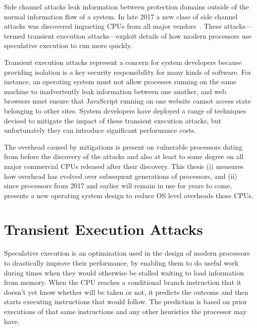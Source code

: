 \noindent
Side channel attacks leak information between protection domains outside of the normal information flow of a system.
In late 2017 a new class of side channel attacks was discovered impacting CPUs from all major vendors~\cite{lipp:meltdown, kocher:spectre}.
These attacks---termed transient execution attacks---exploit details of how modern processors use speculative execution to run more quickly. 

Transient execution attacks represent a concern for system developers because providing isolation is a key security responsibility for many kinds of software.
For instance, an operating system must not allow processes running on the same machine to inadvertently leak information between one another, and web browsers must ensure that JavaScript running on one website cannot access state belonging to other sites.
System developers have deployed a range of techniques devised to mitigate the impact of these transient execution attacks, but unfortunately they can introduce significant performance costs.

The overhead caused by mitigations is present on vulnerable processors dating from before the discovery of the attacks and also at least to some degree on all major commercial CPUs released after their discovery.
This thesis (i) measures how overhead has evolved over subsequent generations of processors, and (ii) since processors from 2017 and earlier will remain in use for years to come, presents a new operating system design to reduce OS level overheads those CPUs.



\section{Transient Execution Attacks}
Speculative execution is an optimization used in the design of modern processors to drastically improve their performance, by enabling them to do useful work during times when they would otherwise be stalled waiting to load information from memory.
When the CPU reaches a conditional branch instruction that it doesn't yet know whether will be taken or not, it predicts the outcome and then starts executing instructions that would follow.
The prediction is based on prior executions of that same instructions and any other heuristics the processor may have.

